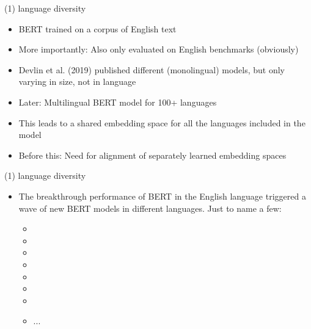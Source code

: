 \begin{frame}{(1) language diversity}

\vfill

	\begin{itemize}
		\item BERT trained on a corpus of English text
		\item More importantly: Also only evaluated on English benchmarks (obviously)
		\item Devlin et al. (2019) published different (monolingual) models, but only varying in size, not in language
		\item Later: Multilingual BERT model  for 100+ languages
		\item This leads to a shared embedding space for all the languages included in the model
		\item Before this: Need for alignment of separately learned embedding spaces
	\end{itemize}

\vfill

\end{frame}


\begin{frame}{(1) language diversity}

\vfill

\begin{itemize}
	\item The breakthrough performance of BERT in the English language triggered a wave of new
				BERT models in different languages. Just to name a few:
			\begin{itemize}
				\item {}
				\item {}
				\item {}
				\item {}
				\item {}
				\item {}
				\item {}
				\item ...
			\end{itemize}
\end{itemize}
	
\vfill

\end{frame}

